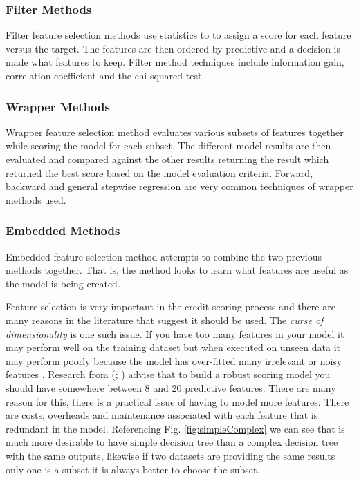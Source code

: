 \subsubsection{Filter Methods}
Filter feature selection methods use statistics to to assign a score for each feature versus the target. The features are then ordered by predictive and a decision is made what features to keep. Filter method techniques include information gain, correlation coefficient and the chi squared test.

\subsubsection{Wrapper Methods}
Wrapper feature selection method evaluates various subsets of features together while scoring the model for each subset. The different model results are then evaluated and compared against the other results returning the result which returned the best score based on the model evaluation criteria. Forward, backward and general stepwise regression are very common techniques of wrapper methods used.

\subsubsection{Embedded Methods}
Embedded feature selection method attempts to combine the two previous methods together. That is, the method looks to learn what features are useful as the model is being created. 

Feature selection is very important in the credit scoring process and there are many reasons in the literature that suggest it should be used. The \textit{curse of dimensionality} is one such issue. If you have too many features in your model it may perform well on the training dataset but when executed on unseen data it may perform poorly because the model has over-fitted many irrelevant or noisy features \citep{loughrey_overfitting_2005}. Research from (\cite{thomas_consumer_2009}; \cite{mays_credit_2004})  advise that to build a robust scoring model you should have somewhere between 8 and 20 predictive features. There are many reason for this, there is a practical issue of having to model more features. There are costs, overheads and maintenance associated with each feature that is redundant in the model. Referencing Fig. \ref{fig:simpleComplex} we can see that is much more desirable to have simple decision tree than a complex decision tree with the same outputs, likewise if two datasets are providing the same results only one is a subset it is always better to choose the subset. 


